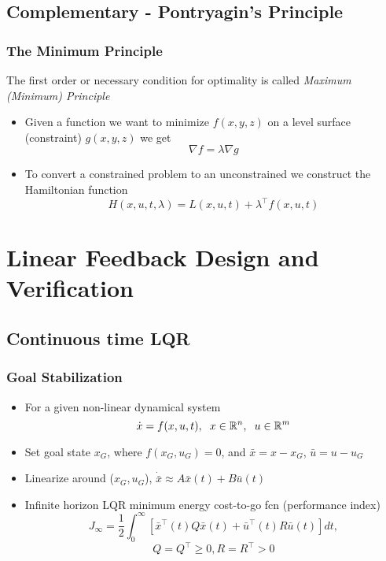 \documentclass{beamer}
\begin{document}

\subsection{Complementary - Pontryagin's Principle}

\begin{frame}
\frametitle{The Minimum Principle}
The first order or necessary condition for optimality is called \textit{Maximum (Minimum) Principle} 
\begin{itemize}
\item Given a function we want to minimize $f(x,y,z)$ on a level surface (constraint) $g(x,y,z)$ we get
\begin{equation*}
  \nabla f =\lambda \nabla g
\end{equation*} 
\item To convert a constrained problem to an unconstrained we construct the Hamiltonian function 
\begin{equation*}
  H(x,u,t,\lambda )= L(x,u,t)+ \lambda^{\intercal}f(x,u,t)
\end{equation*}   
\end{itemize}
\end{frame}

\section{Linear Feedback Design and Verification}

\subsection{Continuous time LQR}

\begin{frame}
\frametitle{Goal Stabilization}
\begin{itemize}
\item For a given non-linear dynamical system
\begin{equation*}
\dot{x} = f(x,u,t), \hspace{.2cm} x\in \mathbb{R}^n, \hspace{.2cm} u\in \mathbb{R}^m 
\end{equation*} 
\item Set goal state $x_G$, where $f(x_G,u_G)=0$, and $\bar{x}=x-x_G$, $\bar{u}=u-u_G$
\item Linearize around ($x_G, u_G$), $\dot{\bar{x}}\approx A\bar{x}(t)+B\bar{u}(t)$ 
\item Infinite horizon LQR minimum energy cost-to-go fcn (performance index)
\begin{equation*}
J_{\infty}= \frac{1}{2}\int_0^{\infty} [ \bar{x}^{\intercal}(t)Q\bar{x}(t)+\bar{u}^{\intercal}(t)R\bar{u}(t)]dt,
\end{equation*}
\begin{equation*}
Q=Q^{\intercal}\geq 0, R=R^{\intercal}> 0
\end{equation*}
\end{itemize}
\end{frame}
\end{document}
